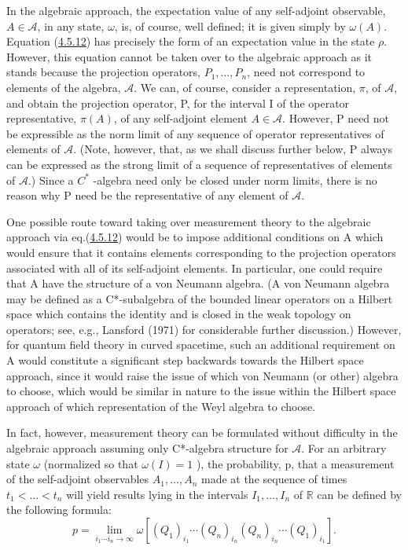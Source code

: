 \documentclass[11pt,a4paper]{article}
\begin{document}
In the algebraic approach, the expectation value of any self-adjoint\hypertarget{source-92}{} observable, \(A \in \mathcal{A}\), in any state, \(\omega\), is, of course, well defined; it is given simply by \(\omega(A)\). Equation (\hyperref[eq:4.5.12]{4.5.12}) has precisely the form of an expectation value in the state \(\rho\). However, this equation cannot be taken over to the algebraic approach as it stands because the projection operators, \(P_1, \ldots, P_n\), need not correspond to elements of the algebra, \(\mathcal{A}\). We can, of course, consider a representation, \(\pi\), of \(\mathcal{A}\), and obtain the projection operator, P, for the interval I of the operator representative, \(\pi(A)\), of any self-adjoint element \(A \in \mathcal{A}\). However, P need not be expressible as the norm limit of any sequence of operator representatives of elements of \(\mathcal{A}\). (Note, however, that, as we shall discuss further below, P always can be expressed as the strong limit of a sequence of representatives of elements of \(\mathcal{A}\).) Since a \(C^*\) -algebra need only be closed under norm limits, there is no reason why P need be the representative of any element of \(\mathcal{A}\).

One possible route toward taking over measurement theory to the algebraic approach via eq.(\hyperref[eq:4.5.12]{4.5.12}) would be to impose additional conditions on A which would ensure that it contains elements corresponding to the projection operators associated with all of its self-adjoint elements. In particular, one could require that A have the structure of a von Neumann algebra. (A von Neumann algebra may be defined as a C*-subalgebra of the bounded linear operators on a Hilbert space which contains the identity and is closed in the weak topology on operators; see, e.g., Lansford (1971) for considerable further discussion.) However, for quantum field theory in curved spacetime, such an additional requirement on A would constitute a significant step backwards towards the Hilbert space approach, since it would raise the issue of which von Neumann (or other) algebra to choose, which would be similar in nature to the issue within the Hilbert space approach of which representation of the Weyl algebra to choose.

In fact, however, measurement theory can be formulated without difficulty in the algebraic approach assuming only C*-algebra structure for \(\mathcal{A}\). For an arbitrary state \(\omega\) (normalized so that \(\omega(I)=1\) ), the probability, p, that a measurement of the self-adjoint observables \(A_1,\ldots,A_n\) made at the sequence of times \(t_1<\ldots< t_n\) will yield results lying in the intervals \(I_1,\ldots,I_n\) of \(\mathbb{R}\) can be defined by the following formula:
\begin{equation*}
p = \lim_{i_1 \cdots i_n \to \infty} \omega[(Q_1)_{i_1} \cdots (Q_n)_{i_n} (Q_n)_{i_n} \cdots (Q_1)_{i_1}] . \tag{4.5.13}\label{eq:4.5.13}
\end{equation*}
\end{document}

